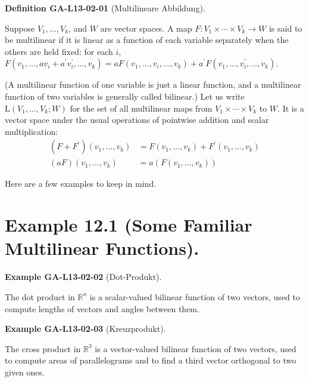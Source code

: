 \documentclass[10pt, letterpaper]{article}
\newcommand{\CustomHeading}[3]{%
  \par\medskip\noindent%
  \textbf{#1 #2} \textnormal{(#3)}.\enskip%
}
\newenvironment{DEF}[2]{\begin{unitbox}\CustomHeading{Definition}{#1}{#2}}{\end{unitbox}}
\newenvironment{EXA}[2]{\begin{unitbox}\CustomHeading{Example}{#1}{#2}}{\end{unitbox}}
\begin{document}
\begin{DEF}{GA-L13-02-01}{Multilineare Abbildung}
Suppose $V_{1}, \ldots, V_{k}$, and $W$ are vector spaces. A map $F: V_{1} \times \cdots \times V_{k} \rightarrow W$ is said to be multilinear if it is linear as a function of each variable separately when the others are held fixed: for each $i$,\\
$F\left(v_{1}, \ldots, a v_{i}+a^{\prime} v_{i}^{\prime}, \ldots, v_{k}\right)=a F\left(v_{1}, \ldots, v_{i}, \ldots, v_{k}\right)+a^{\prime} F\left(v_{1}, \ldots, v_{i}^{\prime}, \ldots, v_{k}\right)$.

(A multilinear function of one variable is just a linear function, and a multilinear function of two variables is generally called bilinear.) Let us write $\mathrm{L}\left(V_{1}, \ldots, V_{k} ; W\right)$ for the set of all multilinear maps from $V_{1} \times \cdots \times V_{k}$ to $W$. It is a vector space under the usual operations of pointwise addition and scalar multiplication:
$$
\begin{aligned}
\left(F+F^{\prime}\right)\left(v_{1}, \ldots, v_{k}\right) & =F\left(v_{1}, \ldots, v_{k}\right)+F^{\prime}\left(v_{1}, \ldots, v_{k}\right) \\
(a F)\left(v_{1}, \ldots, v_{k}\right) & =a\left(F\left(v_{1}, \ldots, v_{k}\right)\right)
\end{aligned}
$$
\end{DEF}





Here are a few examples to keep in mind.



\section*{Example 12.1 (Some Familiar Multilinear Functions).}


\begin{EXA}{GA-L13-02-02}{Dot-Produkt}
The dot product in $\mathbb{R}^{n}$ is a scalar-valued bilinear function of two vectors, used to compute lengths of vectors and angles between them.
\end{EXA}




\begin{EXA}{GA-L13-02-03}{Kreuzprodukt}
The cross product in $\mathbb{R}^{3}$ is a vector-valued bilinear function of two vectors, used to compute areas of parallelograms and to find a third vector orthogonal to two given ones.
\end{EXA}
\end{document}
